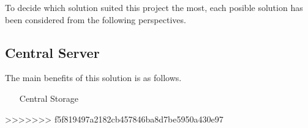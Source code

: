 To decide which solution suited this project the most, each posible solution has been considered from the following perspectives.

\begin{enumerate}

\end{enumerate}

\subsection{Central Server}
The main benefits of this solution is as follows.
\begin{itemize}
\item[Central Storage]
\end{itemize}




>>>>>>> f5f819497a2182cb457846ba8d7be5950a430e97
